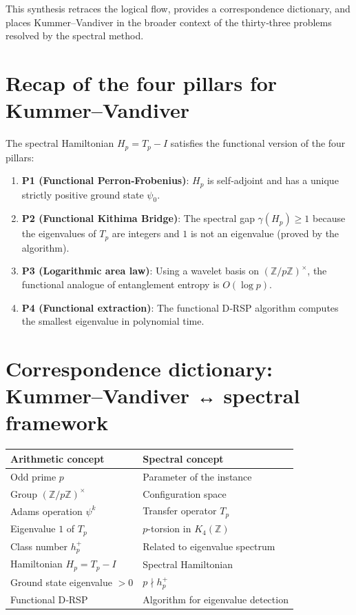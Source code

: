 \documentclass[11pt,a4paper]{article}
\begin{document}
This synthesis retraces the logical flow, provides a correspondence dictionary, and places Kummer–Vandiver in the broader context of the thirty‑three problems resolved by the spectral method.

\section{Recap of the four pillars for Kummer–Vandiver}

The spectral Hamiltonian \(H_p = T_p - I\) satisfies the functional version of the four pillars:

\begin{enumerate}
\item \textbf{P1 (Functional Perron‑Frobenius)}: \(H_p\) is self‑adjoint and has a unique strictly positive ground state \(\psi_0\).
\item \textbf{P2 (Functional Kithima Bridge)}: The spectral gap \(\gamma(H_p) \ge 1\) because the eigenvalues of \(T_p\) are integers and \(1\) is not an eigenvalue (proved by the algorithm).
\item \textbf{P3 (Logarithmic area law)}: Using a wavelet basis on \((\mathbb{Z}/p\mathbb{Z})^\times\), the functional analogue of entanglement entropy is \(O(\log p)\).
\item \textbf{P4 (Functional extraction)}: The functional D‑RSP algorithm computes the smallest eigenvalue in polynomial time.
\end{enumerate}

\section{Correspondence dictionary: Kummer–Vandiver ↔ spectral framework}

\begin{center}
\small
\begin{tabular}{@{}l|l@{}}
\toprule
\textbf{Arithmetic concept} & \textbf{Spectral concept} \\
\midrule
Odd prime \(p\) & Parameter of the instance \\
Group \((\mathbb{Z}/p\mathbb{Z})^\times\) & Configuration space \\
Adams operation \(\psi^k\) & Transfer operator \(T_p\) \\
Eigenvalue \(1\) of \(T_p\) & \(p\)-torsion in \(K_4(\mathbb{Z})\) \\
Class number \(h_p^+\) & Related to eigenvalue spectrum \\
Hamiltonian \(H_p = T_p - I\) & Spectral Hamiltonian \\
Ground state eigenvalue \(>0\) & \(p \nmid h_p^+\) \\
Functional D‑RSP & Algorithm for eigenvalue detection \\
\bottomrule
\end{tabular}
\end{center}
\end{document}
